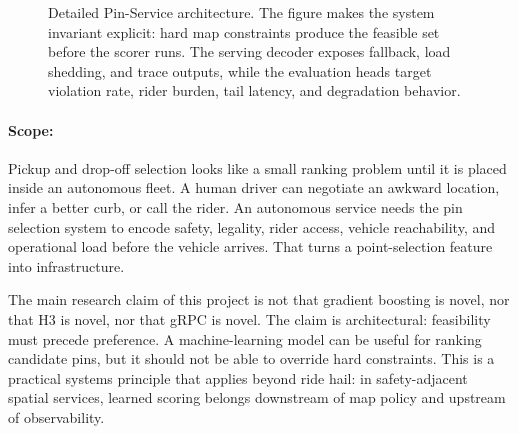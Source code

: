 \documentclass{article}
\makeatletter
\renewcommand{\scriptsize}{\@setfontsize\scriptsize\@viipt\@viiipt}
\renewcommand{\tiny}{\@setfontsize\tiny\@vipt\@viipt}
\makeatother
\begin{document}
\begin{figure}[t]
\caption{Detailed Pin-Service architecture. The figure makes the system invariant explicit: hard map constraints produce the feasible set before the scorer runs. The serving decoder exposes fallback, load shedding, and trace outputs, while the evaluation heads target violation rate, rider burden, tail latency, and degradation behavior.}
\label{fig:pin-architecture}
\end{figure}

\paragraph{Scope:}

Pickup and drop-off selection looks like a small ranking problem until it is placed inside an autonomous fleet. A human driver can negotiate an awkward location, infer a better curb, or call the rider. An autonomous service needs the pin selection system to encode safety, legality, rider access, vehicle reachability, and operational load before the vehicle arrives. That turns a point-selection feature into infrastructure.

The main research claim of this project is not that gradient boosting is novel, nor that H3 is novel, nor that gRPC is novel. The claim is architectural: feasibility must precede preference. A machine-learning model can be useful for ranking candidate pins, but it should not be able to override hard constraints. This is a practical systems principle that applies beyond ride hail: in safety-adjacent spatial services, learned scoring belongs downstream of map policy and upstream of observability.
\end{document}
